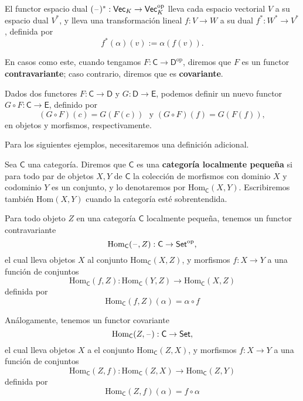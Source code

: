 \documentclass[../main.tex]{subfiles}
\begin{document}
\begin{exampleap}
    El functor espacio dual $(\mathord{\hspace{1pt}\text{--}\hspace{1pt}})^*:\mathsf{Vec}_K \to \mathsf{Vec}^{\text{op}}_K$ lleva cada espacio vectorial $V$ a su espacio dual $V^*$, y lleva una transformaci\'on lineal $f: V \to W$ a su dual $f^*: W^* \to V^*$, definida por
    \[ f^*(\alpha)(v):= \alpha(f(v)). \]
\end{exampleap}

En casos como este, cuando tengamos $F:\mathsf{C} \to \mathsf{D}^{\text{op}}$, diremos que $F$ es un functor \textbf{contravariante}; caso contrario, diremos que es \textbf{covariante}.

\begin{exampleap}
    Dados dos functores $F:\mathsf{C} \to \mathsf{D}$ y $G:\mathsf{D} \to \mathsf{E}$, podemos definir un nuevo functor $G \circ F:\mathsf{C} \to \mathsf{E}$, definido por
    \[(G \circ F)(c) =G(F(c)) \,\, \text{ y } (G \circ F)(f)=G(F(f)),\] en objetos y morfismos, respectivamente.
\end{exampleap}

Para los siguientes ejemplos, necesitaremos una definici\'on adicional.

\begin{definitionap}
    Sea $\mathsf{C}$ una categor\'ia. Diremos que $\mathsf{C}$ es una \textbf{categor\'ia localmente peque\~na} si para todo par de objetos $X,Y$ de $\mathsf{C}$ la colecci\'on de morfismos con dominio $X$ y codominio $Y$ es un conjunto, y lo denotaremos por $\text{Hom}_\mathsf{C}(X,Y)$. Escribiremos tambi\'en $\text{Hom}(X,Y)$ cuando la categor\'ia est\'e sobrentendida.
\end{definitionap}

\begin{exampleap}\label{cat-homa-}
    Para todo objeto $Z$ en una categor\'ia $\mathsf{C}$ localmente peque\~na, tenemos un functor contravariante
    \[ \text{Hom}_\mathsf{C}(\mathord{\hspace{1pt}\text{--}\hspace{1pt}}, Z): \mathsf{C} \to \mathsf{Set}^{\text{op}},\]
    el cual lleva objetos $X$ al conjunto $\text{Hom}_\mathsf{C}(X,Z)$, y morfismos $f:X \to Y$ a una funci\'on de conjuntos
    \[ \text{Hom}_\mathsf{C}(f, Z):\text{Hom}_\mathsf{C}(Y,Z) \to \text{Hom}_\mathsf{C}(X,Z) \]
    definida por
    \[ \text{Hom}_\mathsf{C}(f, Z)(\alpha) = \alpha \circ f \]

    An\'alogamente, tenemos un functor covariante
    \[ \text{Hom}_\mathsf{C}(Z, \mathord{\hspace{1pt}\text{--}\hspace{1pt}}): \mathsf{C} \to \mathsf{Set},\]
    el cual lleva objetos $X$ a el conjunto $\text{Hom}_\mathsf{C}(Z,X)$, y morfismos $f:X \to Y$ a una funci\'on de conjuntos
    \[ \text{Hom}_\mathsf{C}(Z,f):\text{Hom}_\mathsf{C}(Z,X) \to \text{Hom}_\mathsf{C}(Z,Y) \]
    definida por
    \[ \text{Hom}_\mathsf{C}(Z,f)(\alpha) = f \circ \alpha \]
\end{exampleap}
\end{document}
